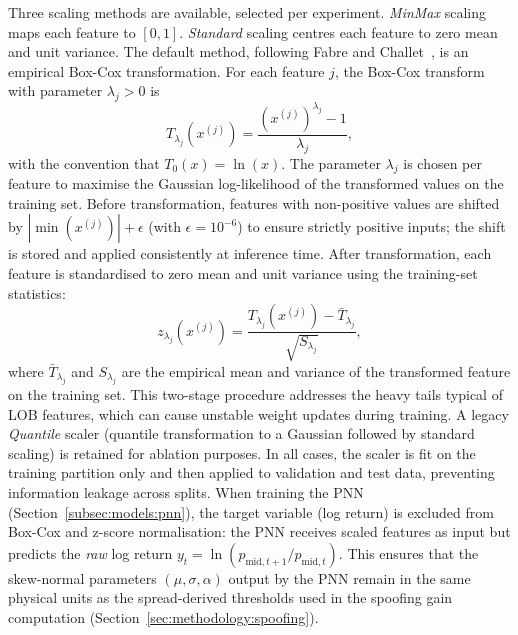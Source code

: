 \documentclass[11pt]{report}
\begin{document}
Three scaling methods are available, selected per experiment.
\emph{MinMax} scaling maps each feature to $[0, 1]$.
\emph{Standard} scaling centres each feature to zero mean and unit variance.
The default method, following Fabre and Challet~\cite{fabre_2025}, is an empirical Box-Cox transformation. For each feature $j$, the Box-Cox transform with parameter $\lambda_j > 0$ is
\begin{equation}
  \label{eq:boxcox}
  T_{\lambda_j}(x^{(j)}) = \frac{(x^{(j)})^{\lambda_j} - 1}{\lambda_j},
\end{equation}
with the convention that $T_0(x) = \ln(x)$.
The parameter $\lambda_j$ is chosen per feature to maximise the Gaussian log-likelihood of the transformed values on the training set. Before transformation, features with non-positive values are shifted by $|\min(x^{(j)})| + \epsilon$ (with $\epsilon = 10^{-6}$) to ensure strictly positive inputs; the shift is stored and applied consistently at inference time.
After transformation, each feature is standardised to zero mean and unit variance using the training-set statistics:
\begin{equation}
  \label{eq:boxcox_zscore}
  z_{\lambda_j}(x^{(j)}) = \frac{T_{\lambda_j}(x^{(j)}) - \bar{T}_{\lambda_j}}{\sqrt{S_{\lambda_j}}},
\end{equation}
where $\bar{T}_{\lambda_j}$ and $S_{\lambda_j}$ are the empirical mean and variance of the transformed feature on the training set. This two-stage procedure addresses the heavy tails typical of LOB features, which can cause unstable weight updates during training. A legacy \emph{Quantile} scaler (quantile transformation to a Gaussian followed by standard scaling) is retained for ablation purposes. In all cases, the scaler is fit on the training partition only and then applied to validation and test data, preventing information leakage across splits. When training the PNN (Section~\ref{subsec:models:pnn}), the target variable (log return) is excluded from Box-Cox and z-score normalisation: the PNN receives scaled features as input but predicts the \emph{raw} log return $y_t = \ln(p_{\text{mid},t+1}/p_{\text{mid},t})$. This ensures that the skew-normal parameters $(\mu, \sigma, \alpha)$ output by the PNN remain in the same physical units as the spread-derived thresholds used in the spoofing gain computation (Section~\ref{sec:methodology:spoofing}).
\end{document}
